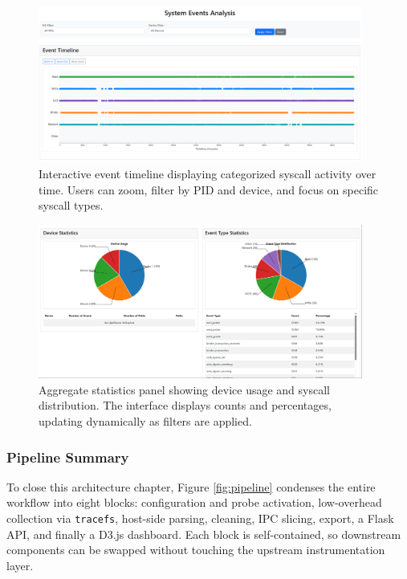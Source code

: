 \documentclass[a4paper,12pt]{report}
\begin{document}
\begin{figure}[H]
\centering
\includegraphics[width=0.95\textwidth]{system_events_timeline.png}
\caption{Interactive event timeline displaying categorized syscall activity over time. Users can zoom, filter by PID and device, and focus on specific syscall types.}
\label{fig:event_timeline}
\end{figure}

\begin{figure}[H]
\centering
\includegraphics[width=0.95\textwidth]{device_event_statistics.png}
\caption{Aggregate statistics panel showing device usage and syscall distribution. The interface displays counts and percentages, updating dynamically as filters are applied.}
\label{fig:statistics_view}
\end{figure}

\subsubsection{Pipeline Summary}

To close this architecture chapter, Figure \ref{fig:pipeline} condenses the entire workflow into eight blocks: configuration and probe activation, low-overhead collection via \texttt{tracefs}, host-side parsing, cleaning, IPC slicing, export, a Flask API, and finally a D3.js dashboard.  Each block is self-contained, so downstream components can be swapped without touching the upstream instrumentation layer.
\end{document}
